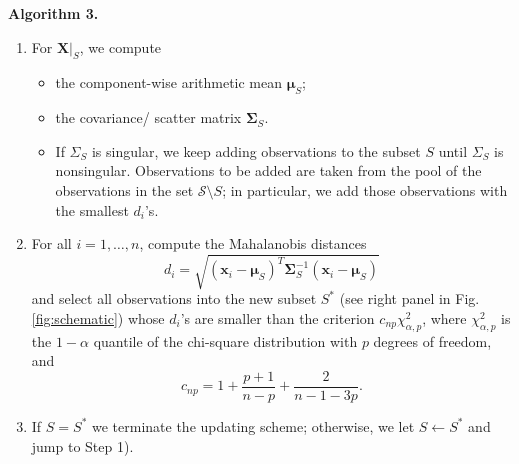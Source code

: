 \documentclass[a4paper,oneside,11pt,DIV=12]{scrartcl}
\begin{document}
\noindent \textbf{\sffamily Algorithm 3.}  
\begin{enumerate}[Step 1)]
	\item For $\bm X\vert_S$, we compute
	\begin{itemize}
		\item the component-wise arithmetic mean $\bm \mu_S$;
		\item the covariance/ scatter matrix $\bm \Sigma_S$. 
		\item If $\Sigma_S$ is singular, we keep adding observations to the subset $S$ until $\Sigma_S$ is nonsingular. Observations to be added are taken from the pool of the observations in the set $\mathscr{S} \setminus S$; in particular, we add those observations with the smallest $d_i$'s.
	\end{itemize}
	\item For all $i=1,\ldots,n$, compute the Mahalanobis distances
	\begin{equation}\label{eq:mahalanobis}
		d_i = \sqrt{(\bm x_i - \bm \mu_S)^T \bm \Sigma_S^{-1} (\bm x_i - \bm \mu_S)}
	\end{equation}
	and select all observations into the new subset $S^*$ (see right panel in Fig. \ref{fig:schematic}) whose $d_i$'s are smaller than the criterion $c_{np} \chi_{\alpha, p}^2$, where $\chi_{\alpha,p}^2$ is the $1-\alpha$ quantile of the chi-square distribution with $p$ degrees of freedom, and
	\begin{equation}\label{eq:criterion}
		c_{np} = 1 + \frac{p + 1}{n - p} + \frac{2}{n - 1 - 3p}.
	\end{equation}
	\item If $S = S^*$ we terminate the updating scheme; otherwise, we let $S \gets S^*$ and jump to Step 1).
\end{enumerate}
\end{document}
